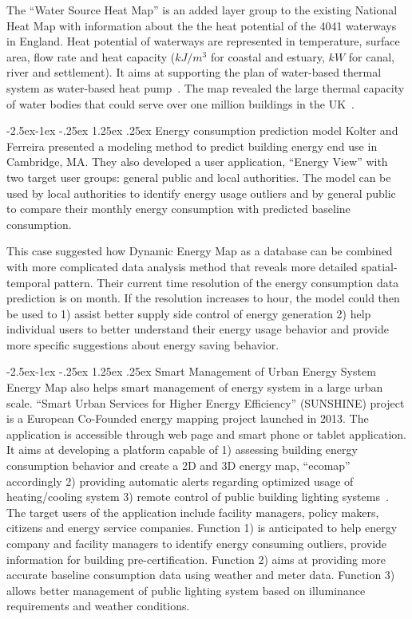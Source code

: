 \documentclass[hidelinks,12pt]{article}
\makeatletter
\renewcommand\paragraph{\@startsection{paragraph}{4}{\z@}%
            {-2.5ex\@plus -1ex \@minus -.25ex}%
            {1.25ex \@plus .25ex}%
            {\normalfont\normalsize\bfseries}}
\makeatother
\begin{document}
The ``Water Source Heat Map'' is an added layer group to the existing
National Heat Map with information about the the heat potential of the
4041 waterways in England. Heat potential of waterways are represented
in temperature, surface area, flow rate and heat capacity ($kJ/m^3$
for coastal and estuary, $kW$ for canal, river and settlement). It
aims at supporting the plan of water-based thermal system as
water-based heat pump~\cite{waterHeatMap}. The map revealed the large
thermal capacity of water bodies that could serve over one million
buildings in the UK~\cite{waterHeatMap}.

\paragraph{Energy consumption prediction model}
Kolter and Ferreira presented a modeling method to predict building
energy end use in Cambridge, MA. They also developed a user
application, ``Energy View'' with two target user groups: general
public and local authorities. The model can be used by local
authorities to identify energy usage outliers and by general public to
compare their monthly energy consumption with predicted baseline
consumption. 

This case suggested how Dynamic Energy Map as a database can be
combined with more complicated data analysis method that reveals more
detailed spatial-temporal pattern. Their current time resolution of
the energy consumption data prediction is on month. If the resolution
increases to hour, the model could then be used to 1) assist better
supply side control of energy generation 2) help individual users to
better understand their energy usage behavior and provide more specific
suggestions about energy saving behavior.

\paragraph{Smart Management of Urban Energy System}
Energy Map also helps smart management of energy system in a large
urban scale. ``Smart Urban Services for Higher Energy Efficiency''
(SUNSHINE) project is a European Co-Founded energy mapping project
launched in 2013. The application is accessible through web page and
smart phone or tablet application. It aims at developing a platform
capable of 1) assessing building energy consumption behavior and
create a 2D and 3D energy map, ``ecomap'' accordingly 2) providing
automatic alerts regarding optimized usage of heating/cooling system
3) remote control of public building lighting
systems~\cite{SUNSHINE2015}. The target users of the application
include facility managers, policy makers, citizens and energy service
companies. Function 1) is anticipated to help energy company and
facility managers to identify energy consuming outliers, provide
information for building pre-certification. Function 2) aims at
providing more accurate baseline consumption data using weather and
meter data. Function 3) allows better management of public lighting
system based on illuminance requirements and weather conditions.
\end{document}
